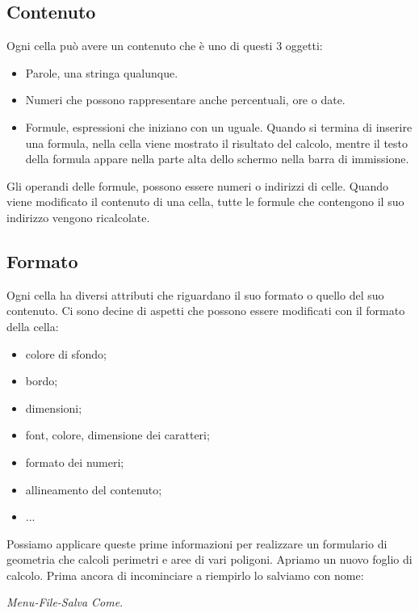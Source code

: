 \subsection{Contenuto}
\label{05_01_f_di_calc:contenuto}

Ogni cella può avere un contenuto che è uno di questi 3 oggetti:

\begin{itemize} [noitemsep]
\item Parole, una stringa qualunque.
\item Numeri che possono rappresentare anche percentuali, ore o date.
\item {}
Formule, espressioni che iniziano con un uguale. Quando si termina di
inserire una formula, nella cella viene mostrato il risultato del calcolo,
mentre il testo della formula appare nella parte alta dello schermo nella
barra di immissione.
\end{itemize}

Gli operandi delle formule, possono essere numeri o indirizzi di celle.
Quando viene modificato il contenuto di una cella, tutte
le formule che contengono il suo indirizzo vengono ricalcolate.

\subsection{Formato}
\label{05_01_f_di_calc:formato}

Ogni cella ha diversi attributi che riguardano il suo formato o quello del
suo contenuto.
Ci sono decine di aspetti che possono essere modificati con
il formato della cella:

\begin{itemize} [noitemsep]
\item colore di sfondo;
\item bordo;
\item dimensioni;
\item font, colore, dimensione dei caratteri;
\item formato dei numeri;
\item allineamento del contenuto;
\item ...
\end{itemize}

Possiamo applicare queste prime informazioni per realizzare un formulario di
geometria che calcoli perimetri e aree di vari poligoni.
Apriamo un nuovo foglio di calcolo. Prima ancora di incominciare a riempirlo
lo salviamo con nome:

\emph{Menu-File-Salva Come}.

